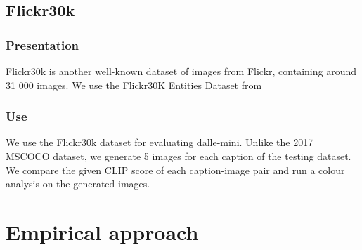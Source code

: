 \documentclass{article}
\begin{document}
\begin{multicols}{2}
\subsection{Flickr30k}

\subsubsection{Presentation}

Flickr30k is another well-known dataset of images from Flickr, containing around 31 000 images.
We use the Flickr30K Entities Dataset from \cite{flickrentitiesijcv}

\subsubsection{Use}

We use the Flickr30k dataset for evaluating dalle-mini. Unlike the 2017 MSCOCO dataset, we generate 5 images for each caption of the testing dataset.
We compare the given CLIP score of each caption-image pair and run a colour analysis on the generated images.

\end{multicols}

\section{Empirical approach}
\end{document}
